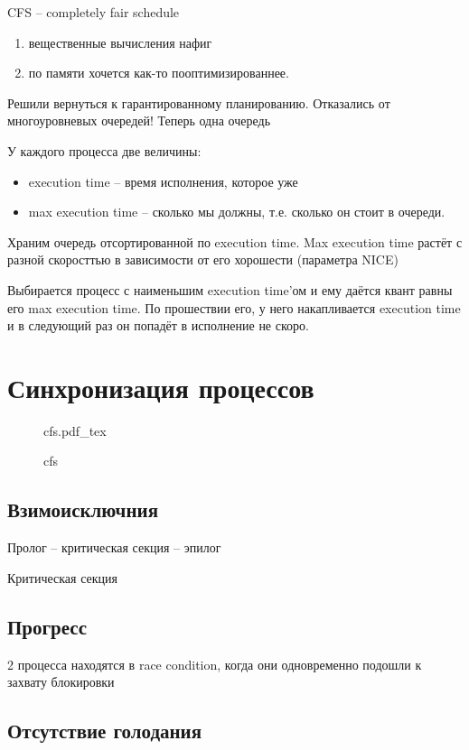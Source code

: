 \documentclass{book}
\theoremstyle{definition}
\newcommand{\incfig}[1]{%
    \def\svgwidth{\columnwidth}
    {#1.pdf_tex}
}
\begin{document}
CFS -- completely fair schedule 

\begin{enumerate}
    \item вещественные вычисления нафиг
    \item по памяти хочется как-то пооптимизированнее.
\end{enumerate}

Решили вернуться к гарантированному планированию. Отказались от многоуровневых очередей! Теперь одна очередь

У каждого процесса две величины:
\begin{itemize}
    \item execution time -- время исполнения, которое уже
    \item max execution time -- сколько мы должны, т.е. сколько он стоит в очереди.
\end{itemize}

Храним очередь отсортированной по execution time. Max execution time растёт с разной скоросттью в зависимости от его хорошести (параметра NICE)

Выбирается процесс с наименьшим execution time'ом и ему даётся квант равны его max execution time. По прошествии его, у него накапливается execution time и в следующий раз он попадёт в исполнение не скоро.

\section{Синхронизация процессов}

\begin{figure}[!ht]
    \centering
    \incfig{cfs}
    \caption{cfs}
    \label{fig:cfs}
\end{figure}


\subsection{Взимоисключния}

Пролог -- критическая секция -- эпилог

Критическая секция

\subsection{Прогресс}

2 процесса находятся в race condition, когда они одновременно подошли к захвату блокировки

\subsection{Отсутствие голодания}
\end{document}
